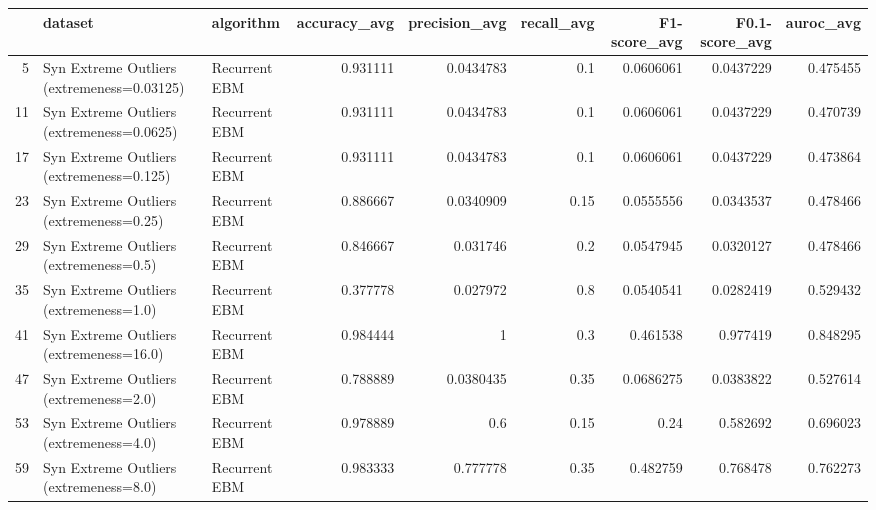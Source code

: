 \begin{tabular}{rllrrrrrr}
\hline
    & dataset                                    & algorithm     &   accuracy\_avg &   precision\_avg &   recall\_avg &   F1-score\_avg &   F0.1-score\_avg &   auroc\_avg \\
\hline
  5 & Syn Extreme Outliers (extremeness=0.03125) & Recurrent EBM &       0.931111 &       0.0434783 &         0.1  &      0.0606061 &        0.0437229 &    0.475455 \\
 11 & Syn Extreme Outliers (extremeness=0.0625)  & Recurrent EBM &       0.931111 &       0.0434783 &         0.1  &      0.0606061 &        0.0437229 &    0.470739 \\
 17 & Syn Extreme Outliers (extremeness=0.125)   & Recurrent EBM &       0.931111 &       0.0434783 &         0.1  &      0.0606061 &        0.0437229 &    0.473864 \\
 23 & Syn Extreme Outliers (extremeness=0.25)    & Recurrent EBM &       0.886667 &       0.0340909 &         0.15 &      0.0555556 &        0.0343537 &    0.478466 \\
 29 & Syn Extreme Outliers (extremeness=0.5)     & Recurrent EBM &       0.846667 &       0.031746  &         0.2  &      0.0547945 &        0.0320127 &    0.478466 \\
 35 & Syn Extreme Outliers (extremeness=1.0)     & Recurrent EBM &       0.377778 &       0.027972  &         0.8  &      0.0540541 &        0.0282419 &    0.529432 \\
 41 & Syn Extreme Outliers (extremeness=16.0)    & Recurrent EBM &       0.984444 &       1         &         0.3  &      0.461538  &        0.977419  &    0.848295 \\
 47 & Syn Extreme Outliers (extremeness=2.0)     & Recurrent EBM &       0.788889 &       0.0380435 &         0.35 &      0.0686275 &        0.0383822 &    0.527614 \\
 53 & Syn Extreme Outliers (extremeness=4.0)     & Recurrent EBM &       0.978889 &       0.6       &         0.15 &      0.24      &        0.582692  &    0.696023 \\
 59 & Syn Extreme Outliers (extremeness=8.0)     & Recurrent EBM &       0.983333 &       0.777778  &         0.35 &      0.482759  &        0.768478  &    0.762273 \\
\hline
\end{tabular}

